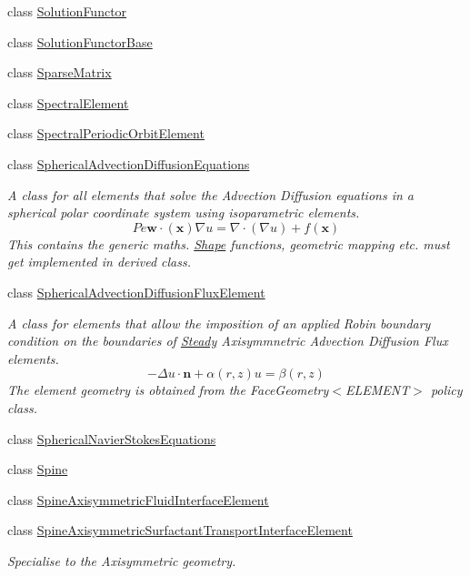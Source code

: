 \begin{DoxyCompactItemize}
class \hyperlink{classoomph_1_1SolutionFunctor}{Solution\+Functor}
\item 
class \hyperlink{classoomph_1_1SolutionFunctorBase}{Solution\+Functor\+Base}
\item 
class \hyperlink{classoomph_1_1SparseMatrix}{Sparse\+Matrix}
\item 
class \hyperlink{classoomph_1_1SpectralElement}{Spectral\+Element}
\item 
class \hyperlink{classoomph_1_1SpectralPeriodicOrbitElement}{Spectral\+Periodic\+Orbit\+Element}
\item 
class \hyperlink{classoomph_1_1SphericalAdvectionDiffusionEquations}{Spherical\+Advection\+Diffusion\+Equations}
\begin{DoxyCompactList}\small\item\em A class for all elements that solve the Advection Diffusion equations in a spherical polar coordinate system using isoparametric elements. \[ Pe \mathbf{w}\cdot(\mathbf{x}) \nabla u = \nabla \cdot \left( \nabla u \right) + f(\mathbf{x}) \] This contains the generic maths. \hyperlink{classoomph_1_1Shape}{Shape} functions, geometric mapping etc. must get implemented in derived class. \end{DoxyCompactList}\item 
class \hyperlink{classoomph_1_1SphericalAdvectionDiffusionFluxElement}{Spherical\+Advection\+Diffusion\+Flux\+Element}
\begin{DoxyCompactList}\small\item\em A class for elements that allow the imposition of an applied Robin boundary condition on the boundaries of \hyperlink{classoomph_1_1Steady}{Steady} Axisymmnetric Advection Diffusion Flux elements. \[ -\Delta u \cdot \mathbf{n} + \alpha(r,z) u = \beta(r,z) \] The element geometry is obtained from the Face\+Geometry$<$\+E\+L\+E\+M\+E\+N\+T$>$ policy class. \end{DoxyCompactList}\item 
class \hyperlink{classoomph_1_1SphericalNavierStokesEquations}{Spherical\+Navier\+Stokes\+Equations}
\item 
class \hyperlink{classoomph_1_1Spine}{Spine}
\item 
class \hyperlink{classoomph_1_1SpineAxisymmetricFluidInterfaceElement}{Spine\+Axisymmetric\+Fluid\+Interface\+Element}
\item 
class \hyperlink{classoomph_1_1SpineAxisymmetricSurfactantTransportInterfaceElement}{Spine\+Axisymmetric\+Surfactant\+Transport\+Interface\+Element}
\begin{DoxyCompactList}\small\item\em Specialise to the Axisymmetric geometry. \end{DoxyCompactList}\item 

\end{DoxyCompactItemize}
